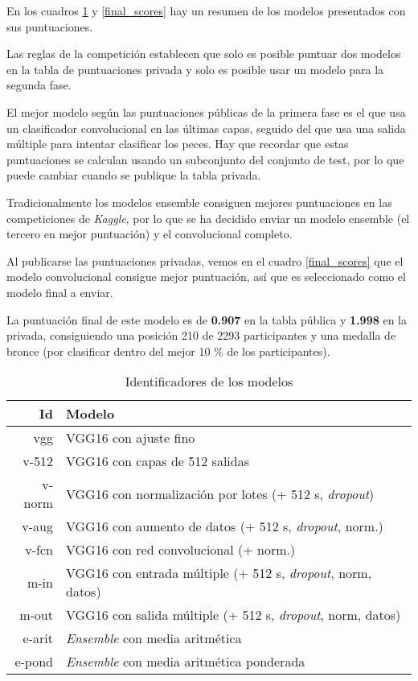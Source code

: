 \begin{itemize}
En los cuadros \ref{model_id} y \ref{final_scores} hay un resumen de los
modelos presentados con sus puntuaciones.

Las reglas de la competición establecen que solo es posible puntuar dos modelos en la tabla de puntuaciones privada y solo es posible usar un modelo para la segunda fase.

El mejor modelo según las puntuaciones públicas de la primera fase es el que usa un clasificador convolucional en las últimas capas, seguido del que usa una salida múltiple para intentar clasificar los peces. Hay que recordar que estas puntuaciones se calculan usando un subconjunto del conjunto de test, por lo que puede cambiar cuando se publique la tabla privada.

Tradicionalmente los modelos ensemble consiguen mejores puntuaciones en las competiciones de \textit{Kaggle}, por lo que se ha decidido enviar un modelo ensemble (el tercero en mejor puntuación) y el convolucional completo.

Al publicarse las puntuaciones privadas, vemos en el cuadro \ref{final_scores} que el modelo convolucional consigue mejor puntuación, así que es seleccionado como el modelo final a enviar.

La puntuación final de este modelo es de \textbf{0.907} en la tabla pública y \textbf{1.998} en la privada, consiguiendo una posición 210 de 2293 participantes y una medalla de bronce (por clasificar dentro del mejor 10 \% de los participantes).

\begin{table}[]
\centering
\caption{Identificadores de los modelos}
\label{model_id}
\begin{tabular}{rl}
\textbf{Id} & \textbf{Modelo}                                                       \\ \hline
vgg         & VGG16 con ajuste fino                                                 \\
v-512       & VGG16 con capas de 512 salidas                                        \\
v-norm      & VGG16 con normalización por lotes (+ 512 s, \textit{dropout})       \\
v-aug       & VGG16 con aumento de datos (+ 512 s, \textit{dropout}, norm.)       \\
v-fcn       & VGG16 con red convolucional (+ norm.)                                 \\
m-in        & VGG16 con entrada múltiple (+ 512 s, \textit{dropout}, norm, datos) \\
m-out       & VGG16 con salida múltiple (+ 512 s, \textit{dropout}, norm, datos)  \\
e-arit      & \textit{Ensemble} con media aritmética                              \\
e-pond      & \textit{Ensemble} con media aritmética ponderada                   
\end{tabular}
\end{table}


\end{itemize}
